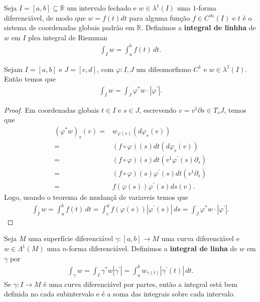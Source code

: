 \begin{definition}
  Seja $I=[a,b]\subseteq\mathbb{R}$ um intervalo fechado e $w\in\lambda^{1}(I)$ uma $1$-forma diferenciável, de modo que $w=f(t)dt$ para alguma função $f\in C^{\infty}(I)$ e $t$ é o sistema de coordenadas globais padrão em $\mathbb{R}$. Definimos a \textbf{integral de linhha} de $w$ em $I$ plea integral de Riemman
  \begin{align*}
    \int_{I}w=\int_{a}^{b}f(t)\,dt.
  \end{align*}
\end{definition}
\begin{proposition}
  Sejam $I=[a,b]$ e $J=[c,d]$, com $\varphi:I,J$ um difeomorfismo $C^{1}$ e $w\in\lambda^{1}(I)$. Então temos que
  \begin{align*}
    \int_{I}w=\int_{J}\varphi^{\ast}w\cdot|\varphi^{\prime}|.
  \end{align*}
\end{proposition}
\begin{proof} 
  Em coordenadas globais $t\in I$ e $s\in J$, escrevendo $v=v^{1}\partial s\in T_s J$, temos que
  \begin{align*}
    (\varphi^{\ast}w)_s(v)=&w_{\varphi(s)}(d\varphi_s(v))\\
    =&(f\circ\varphi)(s)dt(d\varphi_s(v))\\
    =&(f\circ\varphi)(s)dt(v^{1}\varphi^{\prime}(s)\partial_s)\\
    =&(f\circ\varphi)(s)\varphi^{\prime}(s)dt(v^{1}\partial_s)\\
    =&f(\varphi(s))\varphi^{\prime}(s)ds(v).
  \end{align*}
  Logo, usando o teorema de mudançã de variaveis temos que
  \begin{align*}
    \int_{I}w=\int_{a}^{b}f(t)\,dt=\int_{c}^{d}f(\varphi(s))|\varphi^{\prime}(s)|\,ds=\int_{J}\varphi^{\ast}w\cdot|\varphi^{\prime}|.
  \end{align*}
\end{proof}
\begin{definition}
  Seja $M$ uma superfície diferenciável $\gamma:[a,b]\to M$ uma curva diferenciável e $w\in\Lambda^{1}(M)$ uma $n$-forma diferenciável. Definimos a \textbf{integral de linha} de $w$ em $\gamma$ por
  \begin{align*}
    \int_{\gamma}w=\int_{I}\gamma^{\ast}w|\gamma^{\prime}|=\int_{a}^{b}w_{\gamma(t)}|\gamma^{\prime}(t)|\,dt.
  \end{align*}
  Se $\gamma:I\to M$ é uma curva diferenciável por partes, então a integral está bem definida no cada subintervalo e é a soma das integrais sobre cada intervalo. 
\end{definition}

